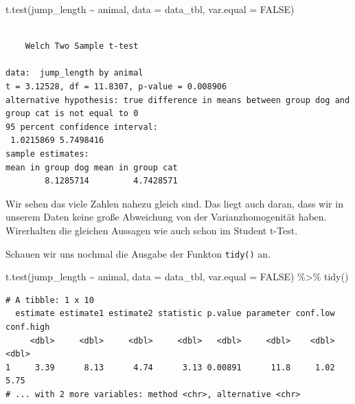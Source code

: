\documentclass[
  letterpaper,
]{scrbook}
\newenvironment{Shaded}{\begin{snugshade}}{\end{snugshade}}
\newcommand{\AttributeTok}[1]{\textcolor[rgb]{0.40,0.45,0.13}{#1}}
\newcommand{\ConstantTok}[1]{\textcolor[rgb]{0.56,0.35,0.01}{#1}}
\newcommand{\FunctionTok}[1]{\textcolor[rgb]{0.28,0.35,0.67}{#1}}
\newcommand{\NormalTok}[1]{\textcolor[rgb]{0.00,0.23,0.31}{#1}}
\newcommand{\SpecialCharTok}[1]{\textcolor[rgb]{0.37,0.37,0.37}{#1}}
\begin{document}
\begin{Shaded}
\begin{Highlighting}[]
\FunctionTok{t.test}\NormalTok{(jump\_length }\SpecialCharTok{\textasciitilde{}}\NormalTok{ animal, }
       \AttributeTok{data =}\NormalTok{ data\_tbl, }\AttributeTok{var.equal =} \ConstantTok{FALSE}\NormalTok{)}
\end{Highlighting}
\end{Shaded}

\begin{verbatim}

    Welch Two Sample t-test

data:  jump_length by animal
t = 3.12528, df = 11.8307, p-value = 0.008906
alternative hypothesis: true difference in means between group dog and group cat is not equal to 0
95 percent confidence interval:
 1.0215869 5.7498416
sample estimates:
mean in group dog mean in group cat 
        8.1285714         4.7428571 
\end{verbatim}

Wir sehen das viele Zahlen nahezu gleich sind. Das liegt auch daran,
dass wir in unserem Daten keine große Abweichung von der
Varianzhomogenität haben. Wirerhalten die gleichen Aussagen wie auch
schon im Student t-Test.

Schauen wir uns nochmal die Ausgabe der Funkton \texttt{tidy()} an.

\begin{Shaded}
\begin{Highlighting}[]
\FunctionTok{t.test}\NormalTok{(jump\_length }\SpecialCharTok{\textasciitilde{}}\NormalTok{ animal, }
       \AttributeTok{data =}\NormalTok{ data\_tbl, }\AttributeTok{var.equal =} \ConstantTok{FALSE}\NormalTok{) }\SpecialCharTok{\%\textgreater{}\%} 
  \FunctionTok{tidy}\NormalTok{() }
\end{Highlighting}
\end{Shaded}

\begin{verbatim}
# A tibble: 1 x 10
  estimate estimate1 estimate2 statistic p.value parameter conf.low conf.high
     <dbl>     <dbl>     <dbl>     <dbl>   <dbl>     <dbl>    <dbl>     <dbl>
1     3.39      8.13      4.74      3.13 0.00891      11.8     1.02      5.75
# ... with 2 more variables: method <chr>, alternative <chr>
\end{verbatim}

{}
\end{document}
